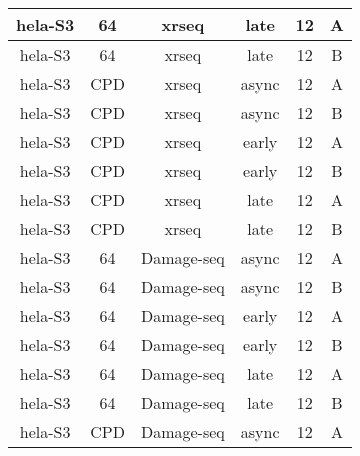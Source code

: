 \begin{table}[H]
\begin{adjustbox}{max width=\textwidth}
\begin{tabular}{cccccc}
    \gls{hela}-S3           & \gls{64}           & \gls{xrseq}         & late             & 12            & A                  \\ \hline 
    \gls{hela}-S3           & \gls{64}           & \gls{xrseq}         & late             & 12            & B                  \\ \hline 
    \gls{hela}-S3           & \gls{CPD}              & \gls{xrseq}         & async            & 12            & A                  \\ \hline 
    \gls{hela}-S3           & \gls{CPD}              & \gls{xrseq}         & async            & 12            & B                  \\ \hline 
    \gls{hela}-S3           & \gls{CPD}              & \gls{xrseq}         & early            & 12            & A                  \\ \hline 
    \gls{hela}-S3           & \gls{CPD}              & \gls{xrseq}         & early            & 12            & B                  \\ \hline 
    \gls{hela}-S3           & \gls{CPD}              & \gls{xrseq}         & late             & 12            & A                  \\ \hline 
    \gls{hela}-S3           & \gls{CPD}              & \gls{xrseq}         & late             & 12            & B                  \\ \hline 
    \gls{hela}-S3           & \gls{64}           & Damage-seq     & async            & 12            & A                  \\ \hline 
    \gls{hela}-S3           & \gls{64}           & Damage-seq     & async            & 12            & B                  \\ \hline 
    \gls{hela}-S3           & \gls{64}           & Damage-seq     & early            & 12            & A                  \\ \hline 
    \gls{hela}-S3           & \gls{64}           & Damage-seq     & early            & 12            & B                  \\ \hline 
    \gls{hela}-S3           & \gls{64}           & Damage-seq     & late             & 12            & A                  \\ \hline 
    \gls{hela}-S3           & \gls{64}           & Damage-seq     & late             & 12            & B                  \\ \hline 
    \gls{hela}-S3           & \gls{CPD}              & Damage-seq     & async            & 12            & A                  \\ \hline 

\end{tabular}
\end{adjustbox}
\end{table}
